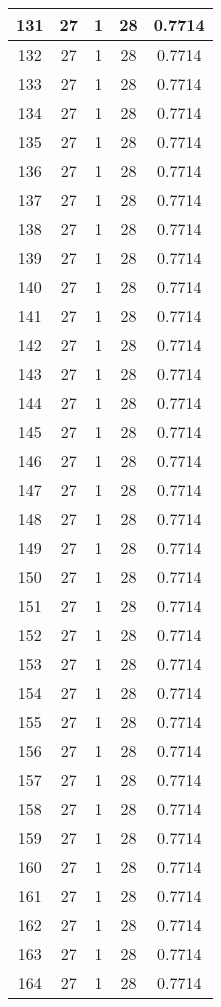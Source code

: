\documentclass[letterpaper, 12pt]{article}
\begin{document}
\begin{longtable}{|c|c|c|c|c|}
\hline
131 & 27 & 1 & 28 & 0.7714 \\
\hline
132 & 27 & 1 & 28 & 0.7714 \\
\hline
133 & 27 & 1 & 28 & 0.7714 \\
\hline
134 & 27 & 1 & 28 & 0.7714 \\
\hline
135 & 27 & 1 & 28 & 0.7714 \\
\hline
136 & 27 & 1 & 28 & 0.7714 \\
\hline
137 & 27 & 1 & 28 & 0.7714 \\
\hline
138 & 27 & 1 & 28 & 0.7714 \\
\hline
139 & 27 & 1 & 28 & 0.7714 \\
\hline
140 & 27 & 1 & 28 & 0.7714 \\
\hline
141 & 27 & 1 & 28 & 0.7714 \\
\hline
142 & 27 & 1 & 28 & 0.7714 \\
\hline
143 & 27 & 1 & 28 & 0.7714 \\
\hline
144 & 27 & 1 & 28 & 0.7714 \\
\hline
145 & 27 & 1 & 28 & 0.7714 \\
\hline
146 & 27 & 1 & 28 & 0.7714 \\
\hline
147 & 27 & 1 & 28 & 0.7714 \\
\hline
148 & 27 & 1 & 28 & 0.7714 \\
\hline
149 & 27 & 1 & 28 & 0.7714 \\
\hline
150 & 27 & 1 & 28 & 0.7714 \\
\hline
151 & 27 & 1 & 28 & 0.7714 \\
\hline
152 & 27 & 1 & 28 & 0.7714 \\
\hline
153 & 27 & 1 & 28 & 0.7714 \\
\hline
154 & 27 & 1 & 28 & 0.7714 \\
\hline
155 & 27 & 1 & 28 & 0.7714 \\
\hline
156 & 27 & 1 & 28 & 0.7714 \\
\hline
157 & 27 & 1 & 28 & 0.7714 \\
\hline
158 & 27 & 1 & 28 & 0.7714 \\
\hline
159 & 27 & 1 & 28 & 0.7714 \\
\hline
160 & 27 & 1 & 28 & 0.7714 \\
\hline
161 & 27 & 1 & 28 & 0.7714 \\
\hline
162 & 27 & 1 & 28 & 0.7714 \\
\hline
163 & 27 & 1 & 28 & 0.7714 \\
\hline
164 & 27 & 1 & 28 & 0.7714 \\

\end{longtable}
\end{document}
